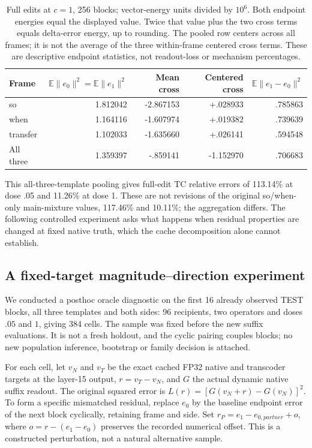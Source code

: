 \begin{table}[ht]\centering\small
\begin{tabular}{lrrrr}\toprule
Frame & $\mathbb{E}\|e_0\|^2=\mathbb{E}\|e_1\|^2$ & Mean cross & Centered cross & $\mathbb{E}\|e_1-e_0\|^2$\\\midrule
so & 1.812042 & -2.867153 & +.028933 & .785863\\
when & 1.164116 & -1.607974 & +.019382 & .739639\\
transfer & 1.102033 & -1.635660 & +.026141 & .594548\\
All three & 1.359397 & -.859141 & -1.152970 & .706683\\\bottomrule
\end{tabular}
\caption{Full edits at $c=1$, 256 blocks; vector-energy units divided by $10^6$. Both endpoint energies equal the displayed value. Twice that value plus the two cross terms equals delta-error energy, up to rounding. The pooled row centers across all frames; it is not the average of the three within-frame centered cross terms. These are descriptive endpoint statistics, not readout-loss or mechanism percentages.}\label{tab:centering}
\end{table}

This all-three-template pooling gives full-edit TC relative errors of 113.14\% at dose .05 and 11.26\% at dose 1. These are not revisions of the original so/when-only main-mixture values, 117.46\% and 10.11\%; the aggregation differs. The following controlled experiment asks what happens when residual properties are changed at fixed native truth, which the cache decomposition alone cannot establish.

\subsection{A fixed-target magnitude--direction experiment}\label{app:magdirection}
We conducted a posthoc oracle diagnostic on the first 16 already observed TEST blocks, all three templates and both sides: 96 recipients, two operators and doses $.05$ and $1$, giving 384 cells. The sample was fixed before the new suffix evaluations. It is not a fresh holdout, and the cyclic pairing couples blocks; no new population inference, bootstrap or family decision is attached.

For each cell, let $v_N$ and $v_T$ be the exact cached FP32 native and transcoder targets at the layer-15 output, $r=v_T-v_N$, and $G$ the actual dynamic native suffix readout. The original squared error is $L(r)=[G(v_N+r)-G(v_N)]^2$. To form a specific mismatched residual, replace $e_0$ by the baseline endpoint error of the next block cyclically, retaining frame and side. Set $r_P=e_1-e_{0,partner}+o$, where $o=r-(e_1-e_0)$ preserves the recorded numerical offset. This is a constructed perturbation, not a natural alternative sample.


